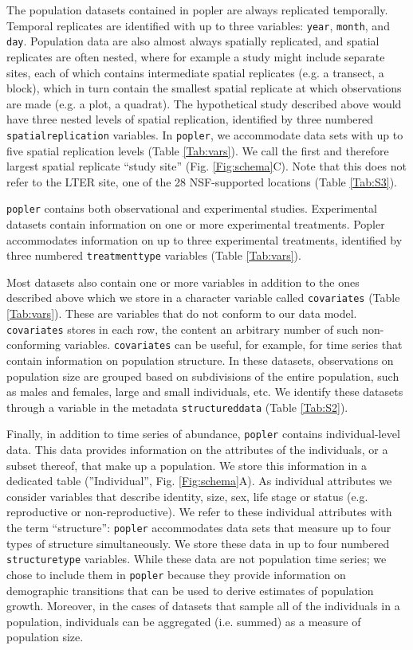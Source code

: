 \documentclass{article}\usepackage[]{graphicx}\usepackage[]{color}
\begin{document}
The population datasets contained in popler are always replicated temporally. Temporal replicates are identified with up to three variables: \texttt{year}, \texttt{month}, and \texttt{day}. Population data are also almost always spatially replicated, and spatial replicates are often nested, where for example a study might include separate sites, each of which contains intermediate spatial replicates (e.g. a transect, a block), which in turn contain the smallest spatial replicate at which observations are made (e.g. a plot, a quadrat). The hypothetical study described above would have three nested levels of spatial replication, identified by three numbered \texttt{spatial\textunderscore replication} variables. In \texttt{popler}, we accommodate data sets with up to five spatial replication levels (Table \ref{Tab:vars}). We call the first and therefore largest spatial replicate ``study site'' (Fig. \ref{Fig:schema}C). Note that this does not refer to the LTER site, one of the 28 NSF-supported locations (Table \ref{Tab:S3}).

\texttt{popler} contains both observational and experimental studies. Experimental datasets contain information on one or more experimental treatments. Popler accommodates information on up to three experimental treatments, identified by three numbered \texttt{treatment\textunderscore type} variables (Table \ref{Tab:vars}). 

Most datasets also contain one or more variables in addition to the ones described above which we store in a character variable called \texttt{covariates} (Table \ref{Tab:vars}). These are variables that do not conform to our data model. \texttt{covariates} stores in each row, the content an arbitrary number of such non-conforming variables. \texttt{covariates} can be useful, for example, for time series that contain information on population structure. In these datasets, observations on population size are grouped based on subdivisions of the entire population, such as males and females, large and small individuals, etc. We identify these datasets through a variable in the metadata \texttt{structured\textunderscore data} (Table \ref{Tab:S2}).

Finally, in addition to time series of abundance, \texttt{popler} contains individual-level data. This data provides information on the attributes of the individuals, or a subset thereof, that make up a population. We store this information in a dedicated table (''Individual'', Fig. \ref{Fig:schema}A). As individual attributes we consider variables that describe identity, size, sex, life stage or status (e.g. reproductive or non-reproductive). We refer to these individual attributes with the term ``structure'': \texttt{popler} accommodates data sets that measure up to four types of structure simultaneously. We store these data in up to four numbered \texttt{structure\textunderscore type} variables. While these data are not population time series; we chose to include them in \texttt{popler} because they provide information on demographic transitions that can be used to derive estimates of population growth. Moreover, in the cases of datasets that sample all of the individuals in a population, individuals can be aggregated (i.e. summed) as a measure of population size.
\end{document}
